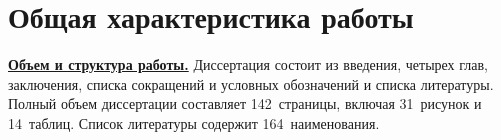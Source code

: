 \section*{Общая характеристика работы}

\newcommand{\actuality}{\pdfbookmark[1]{Актуальность}{actuality}\underline{\textbf{\actualityTXT}}}
\newcommand{\progress}{\pdfbookmark[1]{Разработанность темы}{progress}\underline{\textbf{\progressTXT}}}
\newcommand{\aim}{\pdfbookmark[1]{Цели}{aim}\underline{{\textbf\aimTXT}}}
\newcommand{\tasks}{\pdfbookmark[1]{Задачи}{tasks}\underline{\textbf{\tasksTXT}}}
\newcommand{\aimtasks}{\pdfbookmark[1]{Цели и задачи}{aimtasks}\aimtasksTXT}
\newcommand{\object}{\pdfbookmark[1]{Объект исследования}{object}\underline{\textbf{\objectTXT}}}
\newcommand{\subject}{\pdfbookmark[1]{Предмет исследования}{subject}\underline{\textbf{\subjectTXT}}}
\newcommand{\novelty}{\pdfbookmark[1]{Научная новизна}{novelty}\underline{\textbf{\noveltyTXT}}}
\newcommand{\tinfluence}{\pdfbookmark[1]{Теоретическая значимость}{tinfluence}\underline{\textbf{\tinfluenceTXT}}}
\newcommand{\pinfluence}{\pdfbookmark[1]{Практическая значимость}{pinfluence}\underline{\textbf{\pinfluenceTXT}}}
\newcommand{\methods}{\pdfbookmark[1]{Методология и методы исследования}{methods}\underline{\textbf{\methodsTXT}}}
\newcommand{\defpositions}{\pdfbookmark[1]{Положения, выносимые на защиту}{defpositions}\underline{\textbf{\defpositionsTXT}}}
\newcommand{\passport}{\pdfbookmark[1]{Соответствие паспорту специальности}{passport}\underline{\textbf{\passportTXT}}}
\newcommand{\reliability}{\pdfbookmark[1]{Достоверность}{reliability}\underline{\textbf{\reliabilityTXT}}}
\newcommand{\probation}{\pdfbookmark[1]{Апробация}{probation}\underline{\textbf{\probationTXT}}}
\newcommand{\contribution}{\pdfbookmark[1]{Личный вклад}{contribution}\underline{\textbf{\contributionTXT}}}
\newcommand{\publications}{\pdfbookmark[1]{Публикации}{publications}\underline{\textbf{\publicationsTXT}}}


\underline{\textbf{Объем и структура работы.}} Диссертация состоит из введения, четырех глав, заключения, списка сокращений и условных обозначений и списка литературы. Полный объем диссертации составляет 142~страницы, включая 31~рисунок и 14~таблиц. Список литературы содержит 164~наименования.

